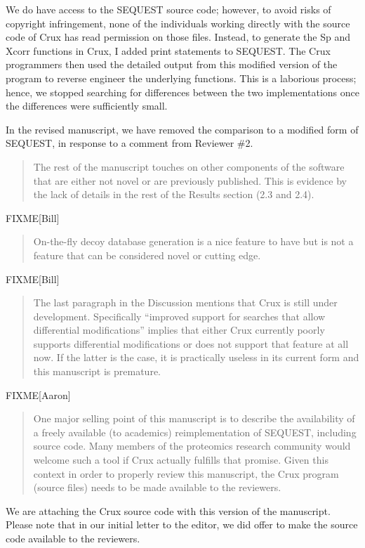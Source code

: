 \documentclass{article}
\newcommand{\breview}{\begin{quotation}\begin{em}\noindent}
\newcommand{\ereview}{\end{em}\end{quotation}}
\begin{document}
We do have access to the SEQUEST source code; however, to avoid risks
of copyright infringement, none of the individuals working directly
with the source code of Crux has read permission on those files.
Instead, to generate the Sp and Xcorr functions in Crux, I added print
statements to SEQUEST.  The Crux programmers then used the detailed
output from this modified version of the program to reverse engineer
the underlying functions.  This is a laborious process; hence, we
stopped searching for differences between the two implementations once
the differences were sufficiently small.

In the revised manuscript, we have removed the comparison to a
modified form of SEQUEST, in response to a comment from Reviewer \#2.

\breview The rest of the manuscript touches on other components of the
software that are either not novel or are previously published.  This
is evidence by the lack of details in the rest of the Results section
(2.3 and 2.4).  \ereview

FIXME[Bill]

\breview On-the-fly decoy database generation is a nice feature to
have but is not a feature that can be considered novel or cutting
edge. \ereview

FIXME[Bill]

\breview The last paragraph in the Discussion mentions that Crux is
still under development.  Specifically ``improved support for searches
that allow differential modifications'' implies that either Crux
currently poorly supports differential modifications or does not
support that feature at all now.  If the latter is the case, it is
practically useless in its current form and this manuscript is
premature. \ereview

FIXME[Aaron]

\breview One major selling point of this manuscript is to describe the
availability of a freely available (to academics) reimplementation of
SEQUEST, including source code.  Many members of the proteomics
research community would welcome such a tool if Crux actually fulfills
that promise.  Given this context in order to properly review this
manuscript, the Crux program (source files) needs to be made available
to the reviewers. \ereview

We are attaching the Crux source code with this version of the
manuscript.  Please note that in our initial letter to the editor, we
did offer to make the source code available to the reviewers.
\end{document}
